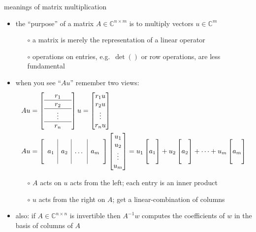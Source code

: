 \documentclass[10pt,hyperref]{beamer}
\newcommand{\CC}{\mathbb{C}}
\newcommand{\trefcolumn}[1]{\begin{bmatrix} \phantom{x} \\ #1 \\ \phantom{x} \end{bmatrix}}
\newcommand{\trefmatrixthree}[3]{\left[\begin{array}{c|c|c|c} & & & \\ #1 & #2 & \dots & #3 \\ & & & \end{array}\right]}
\begin{document}
\begin{frame}{meanings of matrix multiplication}

\begin{itemize}
\item the ``purpose'' of a matrix $A \in \CC^{n\times m}$ is to multiply vectors $u\in \CC^m$
    \begin{itemize}
    \item[$\circ$] a matrix is merely the representation of a linear operator
    \item[$\circ$] operations on entries, e.g.~$\det()$ or row operations, are less fundamental
    \end{itemize}
\item when you see ``$Au$'' remember two views:
\small
\begin{align*}
A u &= \left[\begin{array}{ccc}
& r_1 & \\ \hline
& r_2 & \\ \hline
& \vdots & \\ \hline
& r_n &
\end{array}\right] u = \begin{bmatrix} r_1 u \\ r_2 u \\ \vdots \\ r_n u \end{bmatrix}  \\
A u &= \trefmatrixthree{a_1}{a_2}{a_m} \begin{bmatrix} u_1 \\ u_2 \\ \vdots \\ u_m \end{bmatrix} = u_1 \trefcolumn{a_1} + u_2 \trefcolumn{a_2} + \dots + u_m \trefcolumn{a_m}
\end{align*}
\normalsize
    \begin{itemize}
    \item[$\circ$] $A$ acts on $u$ acts from the left; each entry is an inner product
    \item[$\circ$] $u$ acts from the right on $A$; get a linear-combination of columns
    \end{itemize}
\item also: if $A \in \CC^{n\times n}$ is invertible then $A^{-1}w$ computes the coefficients of $w$ in the basis of columns of $A$
\end{itemize}
\end{frame}
\end{document}
